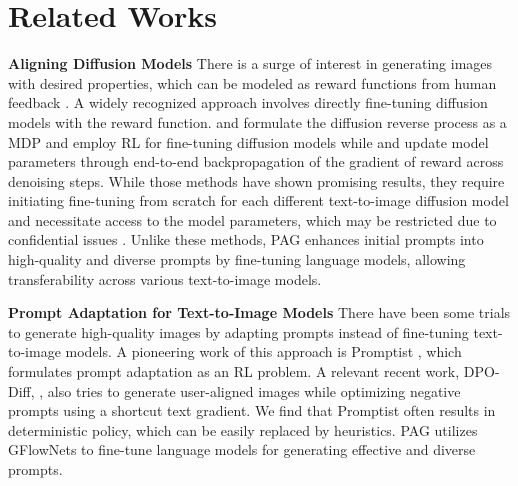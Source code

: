 \section{Related Works}
\noindent\textbf{Aligning Diffusion Models}
There is a surge of interest in generating images with desired properties, which can be modeled as reward functions from human feedback \citep{ouyang2022training}. 
A widely recognized approach involves directly fine-tuning diffusion models with the reward function. \citet{blacktraining} and \citet{fan2024reinforcement} formulate the diffusion reverse process as a MDP and employ RL for fine-tuning diffusion models while \citet{clarkdirectly} and \citet{prabhudesai2023aligning} update model parameters through end-to-end backpropagation of the gradient of reward across denoising steps. 
While those methods have shown promising results, 
they require initiating fine-tuning from scratch for each different text-to-image diffusion model and necessitate access to the model parameters, which may be restricted due to confidential issues \citep{ramesh2022hierarchical, saharia2022photorealistic}. Unlike these methods, PAG enhances initial prompts into high-quality and diverse prompts by fine-tuning language models, allowing transferability across various text-to-image models. 

\vspace{5pt}
\noindent\textbf{Prompt Adaptation for Text-to-Image Models}
There have been some trials to generate high-quality images by adapting prompts instead of fine-tuning text-to-image models. A pioneering work of this approach is Promptist \citep{hao2024optimizing}, which formulates prompt adaptation as an RL problem.
A relevant recent work, DPO-Diff, \citep{wang2024discrete}, also tries to generate user-aligned images while optimizing negative prompts using a shortcut text gradient. We find that Promptist often results in deterministic policy, which can be easily replaced by heuristics. PAG utilizes GFlowNets to fine-tune language models for generating effective and diverse prompts. 

